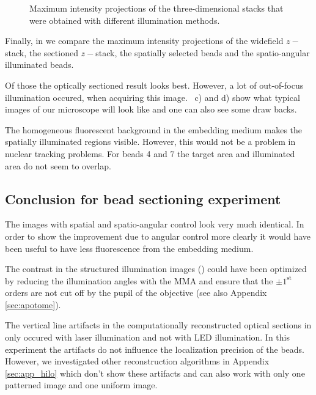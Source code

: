 \begin{figure}[H]
  \centering {}
  \caption{Maximum intensity projections of the three-dimensional
    stacks that were obtained with different illumination methods.}
  \label{fig:mip}
\end{figure}

Finally, in  we compare the maximum intensity
projections of the widefield $z-$stack, the sectioned $z-$stack, the
spatially selected beads and the spatio-angular illuminated beads.

Of those the optically sectioned result looks best. However, a lot of
out-of-focus illumination occured, when acquiring this
image. ~c) and d) show what typical images of our
microscope will look like and one can also see some draw backs.

The homogeneous fluorescent background in the embedding medium makes
the spatially illuminated regions visible. However, this would not be
a problem in nuclear tracking problems. For beads 4 and 7 the target
area and illuminated area do not seem to overlap.

\subsection{Conclusion for bead sectioning experiment}
The images with spatial  and spatio-angular control
 look very much identical. In order to show the
improvement due to angular control more clearly it would have been
useful to have less fluorescence from the embedding medium.

The contrast in the structured illumination images
() could have been optimized by reducing the
illumination angles with the MMA and ensure that the $\pm
1^\textrm{st}$ orders are not cut off by the pupil of the objective
(see also Appendix \ref{sec:apotome}).

The vertical line artifacts in the computationally reconstructed
optical sections in  only occured with laser
illumination and not with LED illumination. In this experiment the
artifacts do not influence the localization precision of the beads.
However, we investigated other reconstruction algorithms in Appendix
\ref{sec:app_hilo} which don't show these artifacts and can also work
with only one patterned image and one uniform image.

